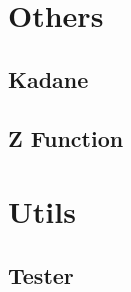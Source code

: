 \section{Others}
\subsection{Kadane}
\raggedbottom
\vspace{-.7\baselineskip}\hrulefill
\vspace{0.1\baselineskip}\subsection{Z Function}
\raggedbottom
\vspace{-.7\baselineskip}\hrulefill
\vspace{0.1\baselineskip}
\section{Utils}
\subsection{Tester}
\raggedbottom
\vspace{-.7\baselineskip}\hrulefill
\vspace{0.1\baselineskip}
